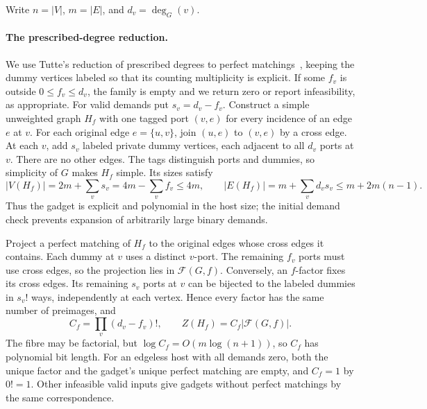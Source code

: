 \documentclass[11pt]{article}
\theoremstyle{definition}
\theoremstyle{remark}
\numberwithin{equation}{section}
\begin{document}
Write $n=|V|$, $m=|E|$, and $d_v=\deg_G(v)$.

\paragraph{The prescribed-degree reduction.}
We use Tutte's reduction of prescribed degrees to perfect
matchings~\cite[pp.~348--349]{Tutte1954}, keeping the dummy vertices
labeled so that its counting multiplicity is explicit.
If some $f_v$ is outside $0\le f_v\le d_v$, the family is empty and we
return zero or report infeasibility, as appropriate. For valid demands put
$s_v=d_v-f_v$. Construct a simple unweighted graph $H_f$ with one tagged
port $(v,e)$ for every incidence of an edge $e$ at $v$. For each original
edge $e=\{u,v\}$, join $(u,e)$ to $(v,e)$ by a cross edge. At each $v$, add
$s_v$ labeled private dummy vertices, each adjacent to all $d_v$ ports at
$v$. There are no other edges. The tags distinguish ports and dummies, so
simplicity of $G$ makes $H_f$ simple. Its sizes satisfy
\[
 |V(H_f)|=2m+\sum_v s_v=4m-\sum_v f_v\le4m,
 \qquad
 |E(H_f)|=m+\sum_v d_vs_v\le m+2m(n-1).
\]
Thus the gadget is explicit and polynomial in the host size; the initial
demand check prevents expansion of arbitrarily large binary demands.

Project a perfect matching of $H_f$ to the original edges whose cross edges
it contains. Each dummy at $v$ uses a distinct $v$-port. The remaining
$f_v$ ports must use cross edges, so the projection lies in $\mathcal F(G,f)$.
Conversely, an $f$-factor fixes its cross edges. Its remaining $s_v$ ports at
$v$ can be bijected to the labeled dummies in $s_v!$ ways, independently at
each vertex. Hence every factor has the same number of preimages, and
\begin{equation}\label{eq:prescribed-degree-fibre}
 C_f=\prod_v(d_v-f_v)!,\qquad Z(H_f)=C_f|\mathcal F(G,f)|.
\end{equation}
The fibre may be factorial, but $\log C_f=O(m\log(n+1))$, so $C_f$ has
polynomial bit length. For an edgeless host with all demands zero, both the
unique factor and the gadget's unique perfect matching are empty, and
$C_f=1$ by $0!=1$. Other infeasible valid inputs give gadgets
without perfect matchings by the same correspondence.
\end{document}
